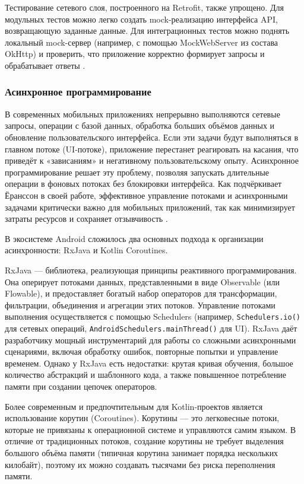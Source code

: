 Тестирование сетевого слоя, построенного на Retrofit, также упрощено. Для модульных тестов можно легко создать mock-реализацию интерфейса API, возвращающую заданные данные. Для интеграционных тестов можно поднять локальный mock-сервер (например, с помощью MockWebServer из состава OkHttp) и проверить, что приложение корректно формирует запросы и обрабатывает ответы \cite{reff}.

\subsubsection{Асинхронное программирование}

В современных мобильных приложениях непрерывно выполняются сетевые запросы, операции с базой данных, обработка больших объёмов данных и обновление пользовательского интерфейса. Если эти задачи будут выполняться в главном потоке (UI-потоке), приложение перестанет реагировать на касания, что приведёт к «зависаниям» и негативному пользовательскому опыту. Асинхронное программирование решает эту проблему, позволяя запускать длительные операции в фоновых потоках без блокировки интерфейса. Как подчёркивает Ёранссон в своей работе, эффективное управление потоками и асинхронными задачами критически важно для мобильных приложений, так как минимизирует затраты ресурсов и сохраняет отзывчивость \cite{refm}.

В экосистеме Android сложилось два основных подхода к организации асинхронности: RxJava и Kotlin Coroutines.

RxJava — библиотека, реализующая принципы реактивного программирования. Она оперирует потоками данных, представленными в виде Observable (или Flowable), и предоставляет богатый набор операторов для трансформации, фильтрации, объединения и агрегации этих потоков. Управление потоками выполнения осуществляется с помощью Schedulers (например, \texttt{Schedulers.io()} для сетевых операций, \texttt{AndroidSchedulers.mainThread()} для UI). RxJava даёт разработчику мощный инструментарий для работы со сложными асинхронными сценариями, включая обработку ошибок, повторные попытки и управление временем. Однако у RxJava есть недостатки: крутая кривая обучения, большое количество абстракций и шаблонного кода, а также повышенное потребление памяти при создании цепочек операторов.

Более современным и предпочтительным для Kotlin-проектов является использование корутин (Coroutines). Корутины — это легковесные потоки, которые не привязаны к операционной системе и управляются самим языком. В отличие от традиционных потоков, создание корутины не требует выделения большого объёма памяти (типичная корутина занимает порядка нескольких килобайт), поэтому их можно создавать тысячами без риска переполнения памяти.

